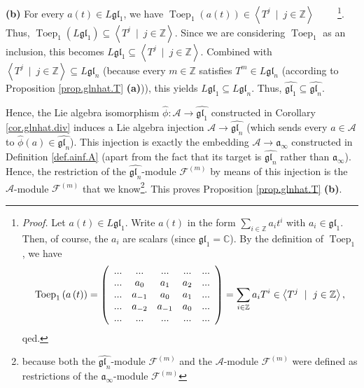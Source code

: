 \documentclass[etingof-lie.tex]{subfiles}
\begin{document}
\textbf{(b)} For every $a\left(  t\right)  \in L\mathfrak{gl}_{1}$, we have
$\operatorname*{Toep}\nolimits_{1}\left(  a\left(  t\right)  \right)
\in\left\langle T^{j}\ \mid\ j\in\mathbb{Z}\right\rangle $%
\ \ \ \ \footnote{\textit{Proof.} Let $a\left(  t\right)  \in L\mathfrak{gl}%
_{1}$. Write $a\left(  t\right)  $ in the form $\sum\limits_{i\in\mathbb{Z}%
}a_{i}t^{i}$ with $a_{i}\in\mathfrak{gl}_{1}$. Then, of course, the $a_{i}$
are scalars (since $\mathfrak{gl}_{1}=\mathbb{C}$). By the definition of
$\operatorname*{Toep}\nolimits_{1}$, we have%
\[
\operatorname*{Toep}\nolimits_{1}\left(  a\left(  t\right)  \right)  =\left(
\begin{array}
[c]{ccccc}%
... & ... & ... & ... & ...\\
... & a_{0} & a_{1} & a_{2} & ...\\
... & a_{-1} & a_{0} & a_{1} & ...\\
... & a_{-2} & a_{-1} & a_{0} & ...\\
... & ... & ... & ... & ...
\end{array}
\right)  =\sum\limits_{i\in\mathbb{Z}}a_{i}T^{i}\in\left\langle T^{j}%
\ \mid\ j\in\mathbb{Z}\right\rangle ,
\]
qed.}. Thus, $\operatorname*{Toep}\nolimits_{1}\left(  L\mathfrak{gl}%
_{1}\right)  \subseteq\left\langle T^{j}\ \mid\ j\in\mathbb{Z}\right\rangle $.
Since we are considering $\operatorname*{Toep}\nolimits_{1}$ as an inclusion,
this becomes $L\mathfrak{gl}_{1}\subseteq\left\langle T^{j}\ \mid
\ j\in\mathbb{Z}\right\rangle $. Combined with $\left\langle T^{j}\ \mid
\ j\in\mathbb{Z}\right\rangle \subseteq L\mathfrak{gl}_{n}$ (because every
$m\in\mathbb{Z}$ satisfies $T^{m}\in L\mathfrak{gl}_{n}$ (according to
Proposition \ref{prop.glnhat.T} \textbf{(a)})), this yields $L\mathfrak{gl}%
_{1}\subseteq L\mathfrak{gl}_{n}$. Thus, $\widehat{\mathfrak{gl}_{1}}%
\subseteq\widehat{\mathfrak{gl}_{n}}$.

Hence, the Lie algebra isomorphism $\widehat{\phi}:\mathcal{A}\rightarrow
\widehat{\mathfrak{gl}_{1}}$ constructed in Corollary \ref{cor.glnhat.div}
induces a Lie algebra injection $\mathcal{A}\rightarrow\widehat{\mathfrak{gl}%
_{n}}$ (which sends every $a\in\mathcal{A}$ to $\widehat{\phi}\left(
a\right)  \in\widehat{\mathfrak{gl}_{n}}$). This injection is exactly the
embedding $\mathcal{A}\rightarrow\mathfrak{a}_{\infty}$ constructed in
Definition \ref{def.ainf.A} (apart from the fact that its target is
$\widehat{\mathfrak{gl}_{n}}$ rather than $\mathfrak{a}_{\infty}$). Hence, the
restriction of the $\widehat{\mathfrak{gl}_{n}}$-module $\mathcal{F}^{\left(
m\right)  }$ by means of this injection is the $\mathcal{A}$-module
$\mathcal{F}^{\left(  m\right)  }$ that we know\footnote{because both the
$\widehat{\mathfrak{gl}_{n}}$-module $\mathcal{F}^{\left(  m\right)  }$ and
the $\mathcal{A}$-module $\mathcal{F}^{\left(  m\right)  }$ were defined as
restrictions of the $\mathfrak{a}_{\infty}$-module $\mathcal{F}^{\left(
m\right)  }$}. This proves Proposition \ref{prop.glnhat.T} \textbf{(b)}.
\end{document}
